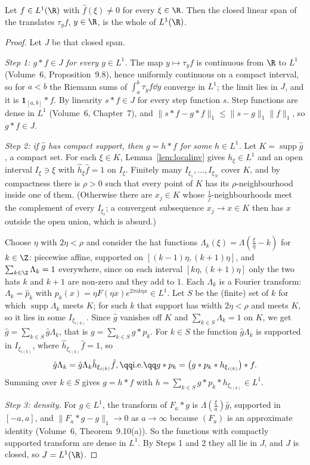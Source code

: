 \begin{theorem}[Wiener, 1932]\label{thm:wienerl1}
Let $f\in L^1(\R)$ with $\hat f(\xi)\ne0$ for every $\xi\in\R$. Then the closed linear span of the translates $\tau_yf$, $y\in\R$, is the whole of $L^1(\R)$.
\end{theorem}
\begin{proof}
Let $J$ be that closed span.

\emph{Step 1: $g*f\in J$ for every $g\in L^1$.} The map $y\mapsto\tau_yf$ is continuous from $\R$ to $L^1$ (Volume~6, Proposition~9.8), hence uniformly
continuous on a compact interval, so for $a<b$ the Riemann sums of $\int_a^b\tau_yf\dd y$ converge in $L^1$; the limit lies in $J$, and it is $\mathbf
1_{[a,b]}*f$. By linearity $s*f\in J$ for every step function $s$. Step functions are dense in $L^1$ (Volume~6, Chapter~7), and
$\|s*f-g*f\|_1\le\|s-g\|_1\|f\|_1$, so $g*f\in J$.

\emph{Step 2: if $\hat g$ has compact support, then $g=h*f$ for some $h\in L^1$.} Let $K=\operatorname{supp}\hat g$, a compact set. For each $\xi\in K$,
Lemma~\ref{lem:localinv} gives $h_\xi\in L^1$ and an open interval $I_\xi\ni\xi$ with $\hat h_\xi\hat f=1$ on $I_\xi$. Finitely many $I_{\xi_1},\dots,I_{\xi_N}$
cover $K$, and by compactness there is $\rho>0$ such that every point of $K$ has its $\rho$-neighbourhood inside one of them. (Otherwise there are
$x_j\in K$ whose $\frac1j$-neighbourhoods meet the complement of every $I_{\xi_i}$; a convergent subsequence $x_j\to x\in K$ then has $x$ outside the open
union, which is absurd.)

Choose $\eta$ with $2\eta<\rho$ and consider the hat functions $\Lambda_k(\xi)=\Lambda(\frac\xi\eta-k)$ for $k\in\Z$: piecewise affine, supported on
$[(k-1)\eta,(k+1)\eta]$, and $\sum_{k\in\Z}\Lambda_k=1$ everywhere, since on each interval $[k\eta,(k+1)\eta]$ only the two hats $k$ and $k+1$ are non-zero and they
add to $1$. Each $\Lambda_k$ is a Fourier transform: $\Lambda_k=\hat p_k$ with $p_k(x)=\eta F(\eta x)e^{2\pi ik\eta x}\in L^1$. Let $S$ be the (finite) set of $k$ for which
$\operatorname{supp}\Lambda_k$ meets $K$; for such $k$ that support has width $2\eta<\rho$ and meets $K$, so it lies in some $I_{\xi_{i(k)}}$. Since $\hat g$ vanishes
off $K$ and $\sum_{k\in S}\Lambda_k=1$ on $K$, we get $\hat g=\sum_{k\in S}\hat g\Lambda_k$, that is $g=\sum_{k\in S}g*p_k$. For $k\in S$ the function $\hat g\Lambda_k$ is
supported in $I_{\xi_{i(k)}}$, where $\hat h_{\xi_{i(k)}}\hat f=1$, so
\[
\hat g\Lambda_k=\hat g\Lambda_k\hat h_{\xi_{i(k)}}\hat f,\qq\text{i.e.}\qq g*p_k=\bigl(g*p_k*h_{\xi_{i(k)}}\bigr)*f.
\]
Summing over $k\in S$ gives $g=h*f$ with $h=\sum_{k\in S}g*p_k*h_{\xi_{i(k)}}\in L^1$.

\emph{Step 3: density.} For $g\in L^1$, the transform of $F_a*g$ is $\Lambda(\frac\xi a)\hat g$, supported in $[-a,a]$, and $\|F_a*g-g\|_1\to0$ as $a\to\infty$
because $(F_a)$ is an approximate identity (Volume~6, Theorem~9.10(a)). So the functions with compactly supported transform are dense in $L^1$. By Steps 1
and 2 they all lie in $J$, and $J$ is closed, so $J=L^1(\R)$.
\end{proof}

